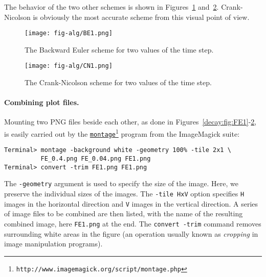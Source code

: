 \documentclass[graybox,sectrefs,envcountresetchap,open=right,final]{svmonodo}
\begin{document}
The behavior of the two other schemes is shown in Figures~\ref{decay:fig:BE1}
and~\ref{decay:fig:CN1}. Crank-Nicolson is obviously the most accurate
scheme from this visual point of view.


\begin{figure}[!ht]  %
  \centerline{\texttt{[image: fig-alg/BE1.png]}}
  \caption{
  The Backward Euler scheme for two values of the time step. \label{decay:fig:BE1}
  }
\end{figure}



\begin{figure}[!ht]  %
  \centerline{\texttt{[image: fig-alg/CN1.png]}}
  \caption{
  The Crank-Nicolson scheme for two values of the time step. \label{decay:fig:CN1}
  }
\end{figure}




\paragraph{Combining plot files.}
Mounting two PNG files beside each other, as done in Figures~\ref{decay:fig:FE1}-\ref{decay:fig:CN1}, is easily carried out by the
\href{{http://www.imagemagick.org/script/montage.php}}{\nolinkurl{montage}\footnote{\texttt{http://www.imagemagick.org/script/montage.php}}} program
from the ImageMagick suite:

\begin{Verbatim}[frame=lines,label=\fbox{{\tiny Terminal}},framesep=2.5mm,framerule=0.7pt,fontsize=\fontsize{9pt}{9pt}]
Terminal> montage -background white -geometry 100% -tile 2x1 \ 
          FE_0.4.png FE_0.04.png FE1.png
Terminal> convert -trim FE1.png FE1.png
\end{Verbatim}
The \texttt{-geometry} argument is used to specify the size of the image. Here,
we preserve the individual sizes of the images. The \texttt{-tile HxV} option
specifies \texttt{H} images in the horizontal direction and \texttt{V} images in
the vertical direction. A series of image files to be combined are then listed,
with the name of the resulting combined image, here \texttt{FE1.png} at the end.
The \texttt{convert -trim} command removes surrounding white areas in the figure
(an operation usually known as \emph{cropping} in image manipulation programs).
\end{document}
